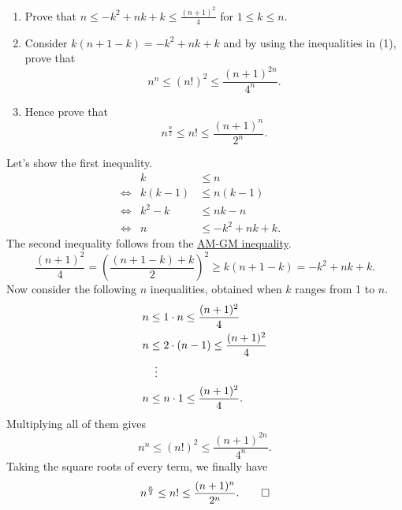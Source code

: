 \begin{question}
    \begin{enumerate}
        \item Prove that $n \leq -k^2 + nk + k \leq \frac{(n + 1)^2}{4}$ for $1
            \leq k \leq n$. 
        
        \item Consider $k(n + 1 - k) = -k^2 + nk + k$ and by using the
            inequalities in (1), prove that 
            \[n^n \leq (n!)^2 \leq \frac{(n + 1)^{2n}}{4^n}.\]
        
        \item Hence prove that 
            \[n^{\frac{n}{2}} \leq n! \leq \frac{(n + 1)^n}{2^n}.\]
    \end{enumerate}
\end{question}
\begin{solution}
    Let's show the first inequality.
    \begin{align*}
        && k &\leq n &&\\
        &\Longleftrightarrow& k(k - 1) &\leq n(k - 1) &&\\
        &\Longleftrightarrow& k^2 - k &\leq nk - n && \\
        &\Longleftrightarrow& n &\leq -k^2 + nk + k. &&
    \end{align*}
    The second inequality follows from the \hyperref[thm: amgm]{AM-GM inequality}. 
    \[ \frac{(n + 1)^2}{4} = \left( \frac{(n + 1 - k) + k}{2} \right)^2 \geq
    k(n + 1 - k) = -k^2 + nk + k. \]
    Now consider the following $n$ inequalities, obtained when $k$ ranges from
    1 to $n$.
    \begin{align*}
        n &\leq 1 \cdot n \leq \frac{(n + 1)^2}{4}\\
        n &\leq 2 \cdot (n - 1) \leq \frac{(n + 1)^2}{4}\\
        &\vdotswithin{\leq}\\
        n &\leq n \cdot 1 \leq \frac{(n + 1)^2}{4}.
    \end{align*}
    Multiplying all of them gives
    \[ n^n \leq (n!)^2 \leq \frac{(n + 1)^{2n}}{4^n}. \]
    Taking the square roots of every term, we finally have
    \[ n^{\frac{n}{2}} \leq n! \leq \frac{(n + 1)^n}{2^n}. \qedhere \]
\end{solution}
